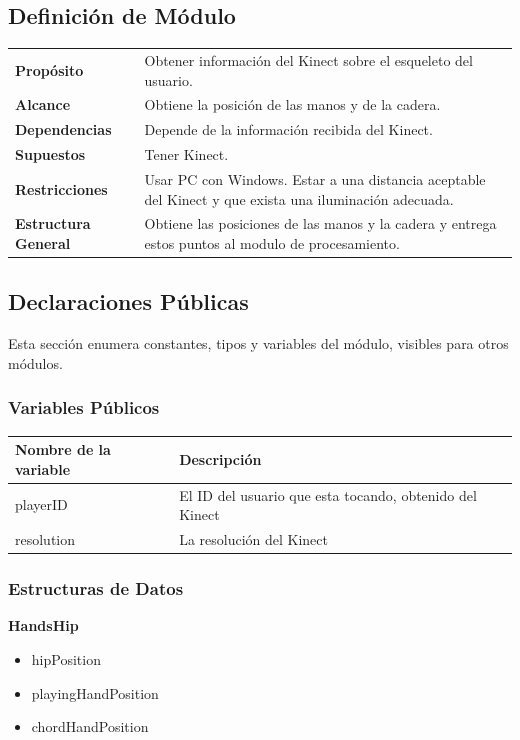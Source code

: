 \documentclass[a4paper,10pt]{article}
\begin{document}
\subsection{Definición de Módulo}
\begin{tabularx}{\textwidth}{p{25mm} X}
        \textbf{Propósito} & Obtener información del Kinect sobre el esqueleto del usuario.\\
        \textbf{Alcance} & Obtiene la posición de las manos y de la cadera.\\
        \textbf{Dependencias} & Depende de la información recibida del Kinect.\\
        \textbf{Supuestos} & Tener Kinect. \\
        \textbf{Restricciones} & Usar PC con Windows. Estar a una distancia aceptable del Kinect y que exista una iluminación adecuada.\\
        \textbf{Estructura General} & Obtiene las posiciones de las manos y la cadera y entrega estos puntos al modulo de procesamiento.\\
\end{tabularx}
\subsection{Declaraciones Públicas}
Esta sección enumera constantes, tipos y variables del módulo, visibles para
otros módulos.

\subsubsection{Variables Públicos}
\begin{tabular}{| p{30mm} | p{10cm} |}
        \hline
        \textbf{Nombre de la \mbox{variable}} & \textbf{Descripción} \\
        \hline
        playerID & El ID del usuario que esta tocando, obtenido del Kinect \\
        \hline
        resolution & La resolución del Kinect\\
        \hline
\end{tabular}
\subsubsection{Estructuras de Datos}
\textbf{HandsHip}
\begin{itemize}
        \item hipPosition
        \item playingHandPosition
        \item chordHandPosition 
\end{itemize}
\end{document}
